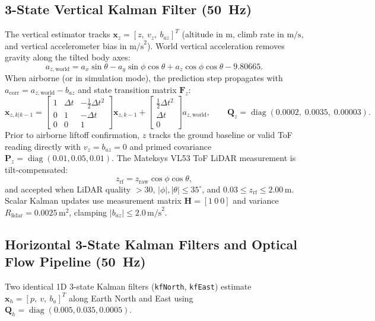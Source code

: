 \documentclass[11pt,a4paper]{article}
\begin{document}
\subsection{3-State Vertical Kalman Filter (50~Hz)}
The vertical estimator tracks $\mathbf{x}_z = [z,\ v_z,\ b_{az}]^T$ (altitude in $\text{m}$, climb rate in $\text{m/s}$, and vertical accelerometer bias in $\text{m/s}^2$). World vertical acceleration removes gravity along the tilted body axes:
\begin{equation}
  a_{z,\text{world}} = a_x \sin\theta - a_y \sin\phi\cos\theta + a_z \cos\phi\cos\theta - 9.80665.
\end{equation}
When airborne (or in simulation mode), the prediction step propagates with $a_{\text{corr}} = a_{z,\text{world}} - b_{az}$ and state transition matrix $\mathbf{F}_z$:
\begin{equation}
  \mathbf{x}_{z,k|k-1} = \begin{bmatrix} 1 & \Delta t & -\frac{1}{2}\Delta t^2 \\ 0 & 1 & -\Delta t \\ 0 & 0 & 1 \end{bmatrix} \mathbf{x}_{z,k-1} + \begin{bmatrix} \frac{1}{2}\Delta t^2 \\ \Delta t \\ 0 \end{bmatrix} a_{z,\text{world}}, \qquad
  \mathbf{Q}_z = \operatorname{diag}(0.0002,\; 0.0035,\; 0.00003).
\end{equation}
Prior to airborne liftoff confirmation, $z$ tracks the ground baseline or valid ToF reading directly with $v_z = b_{az} = 0$ and primed covariance $\mathbf{P}_z = \operatorname{diag}(0.01, 0.05, 0.01)$. The Mateksys VL53 ToF LiDAR measurement is tilt-compensated:
\begin{equation}
  z_{\text{rf}} = z_{\text{raw}} \cos\phi \cos\theta,
\end{equation}
and accepted when LiDAR quality $> 30$, $|\phi|,|\theta| \le 35^\circ$, and $0.03 \le z_{\text{rf}} \le 2.00\,\text{m}$. Scalar Kalman updates use measurement matrix $\mathbf{H} = [1\ 0\ 0]$ and variance $R_{\text{lidar}} = 0.0025\,\text{m}^2$, clamping $|b_{az}| \le 2.0\,\text{m/s}^2$.

\subsection{Horizontal 3-State Kalman Filters and Optical Flow Pipeline (50~Hz)}
Two identical 1D 3-state Kalman filters (\texttt{kfNorth}, \texttt{kfEast}) estimate $\mathbf{x}_h = [p,\ v,\ b_a]^T$ along Earth North and East using $\mathbf{Q}_h = \operatorname{diag}(0.005, 0.035, 0.0005)$.
\end{document}
